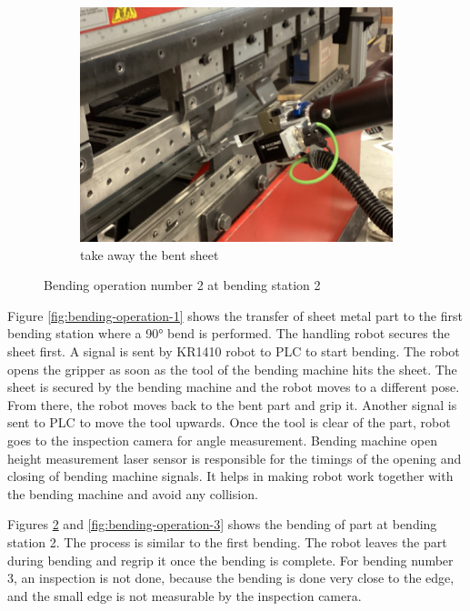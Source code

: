 \begin{figure}[h]
    \begin{subfigure}[b]{0.32\textwidth}
        \centering
        \includegraphics[width=\textwidth]{figures/bending/bending2-002.png}
        \caption{take away the bent sheet}
        \label{subfig:bending2-after}
    \end{subfigure}\hspace{0.1cm}
    \caption{Bending operation number 2 at bending station 2}
    \label{fig:bending-operation-2}
\end{figure}


Figure \ref{fig:bending-operation-1} shows the transfer of sheet metal part to the first bending station where a 90° bend is performed. The handling robot secures the sheet first. A signal is sent by KR1410 robot to PLC to start bending. The robot opens the gripper as soon as the tool of the bending machine hits the sheet. The sheet is secured by the bending machine and the robot moves to a different pose. From there, the robot moves back to the bent part and grip it. Another signal is sent to PLC to move the tool upwards. Once the tool is clear of the part, robot goes to the inspection camera for angle measurement. Bending machine open height measurement laser sensor is responsible for the timings of the opening and closing of bending machine signals. It helps in making robot work together with the bending machine and avoid any collision.


Figures \ref{fig:bending-operation-2} and \ref{fig:bending-operation-3} shows the bending of part at bending station 2. The process is similar to the first bending. The robot leaves the part during bending and regrip it once the bending is complete. For bending number 3, an inspection is not done, because the bending is done very close to the edge, and the small edge is not measurable by the inspection camera.


